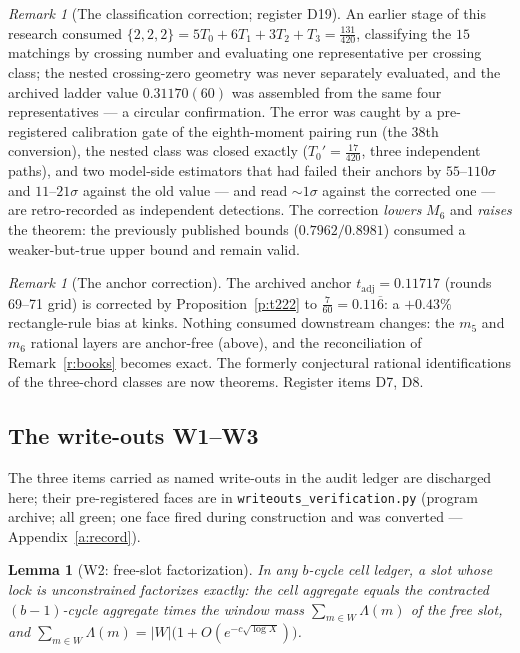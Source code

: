 \documentclass[11pt]{article}
\numberwithin{equation}{section}
\newtheorem{lemma}[theorem]{Lemma}
\theoremstyle{definition}
\theoremstyle{remark}
\newtheorem{remark}[theorem]{Remark}
\newcommand{\LL}{\Lambda}
\begin{document}
\begin{remark}[The classification correction; register
D19]\label{r:d19}
An earlier stage of this research consumed
$\{2,2,2\}=5T_0+6T_1+3T_2+T_3=\tfrac{131}{420}$, classifying
the $15$ matchings by crossing number and evaluating one
representative per crossing class; the nested crossing-zero
geometry was never separately evaluated, and the archived
ladder value $0.31170(60)$ was assembled from the same four
representatives --- a circular confirmation. The error was
caught by a pre-registered calibration gate of the
eighth-moment pairing run (the $38$th conversion), the nested
class was closed exactly ($T_0'=\tfrac{17}{420}$, three
independent paths), and two model-side estimators that had
failed their anchors by $55$--$110\sigma$ and $11$--$21\sigma$
against the old value --- and read $\sim1\sigma$ against the
corrected one --- are retro-recorded as independent detections.
The correction \emph{lowers} $M_6$ and \emph{raises} the
theorem: the previously published bounds ($0.7962/0.8981$)
consumed a weaker-but-true upper bound and remain valid.
\end{remark}

\begin{remark}[The anchor correction]\label{r:anchor}
The archived anchor $t_{\mathrm{adj}}=0.11717$ (rounds 69--71
grid) is corrected by Proposition~\ref{p:t222} to
$\tfrac7{60}=0.11\overline{6}$: a $+0.43\%$ rectangle-rule bias
at kinks. Nothing consumed downstream changes: the $m_5$ and
$m_6$ rational layers are anchor-free (above), and the
reconciliation of Remark~\ref{r:books} becomes exact. The
formerly conjectural rational identifications of the three-chord
classes are now theorems. Register items D7, D8.
\end{remark}

\subsection{The write-outs W1--W3}\label{s:writeouts}

The three items carried as named write-outs in the audit ledger
are discharged here; their pre-registered faces are in
\texttt{writeouts\_verification.py} (program archive; all green;
one face fired during construction and was converted ---
Appendix~\ref{a:record}).

\begin{lemma}[W2: free-slot factorization]\label{l:W2}
In any $b$-cycle cell ledger, a slot whose lock is unconstrained
factorizes exactly: the cell aggregate equals the contracted
$(b-1)$-cycle aggregate times the window mass
$\sum_{m\in W}\LL(m)$ of the free slot, and
$\sum_{m\in W}\LL(m)=|W|\bigl(1+O(e^{-c\sqrt{\log X}})\bigr)$.
\end{lemma}
\end{document}
